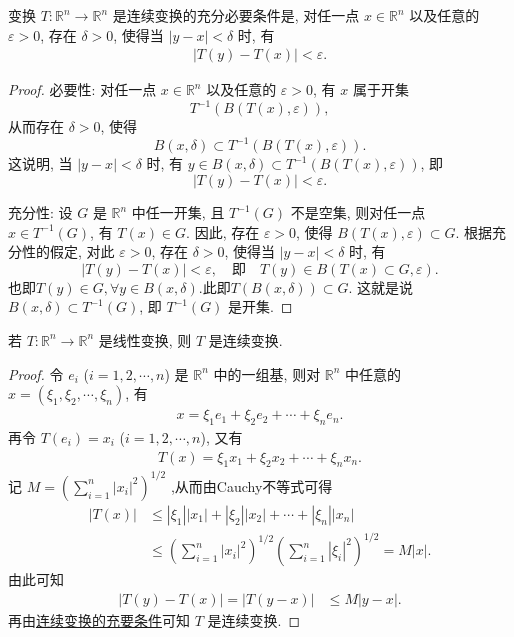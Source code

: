\documentclass[../../main.tex]{subfiles}
\begin{document}
\begin{theorem}[连续变换的充要条件]\label{theorem:连续变换的充要条件}
变换 $T:\mathbb{R}^n\to\mathbb{R}^n$ 是连续变换的充分必要条件是, 对任一点 $x\in\mathbb{R}^n$ 以及任意的 $\varepsilon>0$, 存在 $\delta>0$, 使得当 $|y - x|<\delta$ 时, 有
\begin{align}
|T(y) - T(x)|<\varepsilon.\label{eq:thm221}
\end{align}
\end{theorem}
\begin{proof}
{\heiti 必要性:} 对任一点 $x\in\mathbb{R}^n$ 以及任意的 $\varepsilon>0$, 有 $x$ 属于开集
\[
T^{-1}(B(T(x),\varepsilon)),
\]
从而存在 $\delta>0$, 使得
\[
B(x,\delta)\subset T^{-1}(B(T(x),\varepsilon)).
\]
这说明, 当 $|y - x|<\delta$ 时, 有 $y\in B(x,\delta)\subset T^{-1}(B(T(x),\varepsilon))$, 即
\[
|T(y) - T(x)|<\varepsilon.
\]

{\heiti 充分性:} 设 $G$ 是 $\mathbb{R}^n$ 中任一开集, 且 $T^{-1}(G)$ 不是空集, 则对任一点 $x\in T^{-1}(G)$, 有 $T(x)\in G$. 因此, 存在 $\varepsilon>0$, 使得 $B(T(x),\varepsilon)\subset G$. 根据充分性的假定, 对此 $\varepsilon>0$, 存在 $\delta>0$, 使得当 $|y - x|<\delta$ 时, 有
\[
|T(y) - T(x)|<\varepsilon,\quad \text{即}\quad T(y)\in B(T(x)\subset G,\varepsilon).
\]
也即$T(y)\in G,\forall y\in B(x,\delta)$.此即$T(B(x,\delta))\subset G$.
这就是说 $B(x,\delta)\subset T^{-1}(G)$, 即 $T^{-1}(G)$ 是开集. 
\end{proof}

\begin{proposition}
若 $T:\mathbb{R}^n\to\mathbb{R}^n$ 是线性变换, 则 $T$ 是连续变换.
\end{proposition}
\begin{proof}
令 $e_i$ ($i = 1,2,\cdots,n$) 是 $\mathbb{R}^n$ 中的一组基, 则对 $\mathbb{R}^n$ 中任意的 $x = (\xi_1,\xi_2,\cdots,\xi_n)$, 有
\begin{align*}
x = \xi_1e_1 + \xi_2e_2 + \cdots + \xi_ne_n.
\end{align*}
再令 $T(e_i) = x_i$ ($i = 1,2,\cdots,n$), 又有
\begin{align*}
T(x) = \xi_1x_1 + \xi_2x_2 + \cdots + \xi_nx_n.
\end{align*}
记 $M = \left(\sum_{i = 1}^{n}|x_i|^2\right)^{1/2}$ ,从而由Cauchy不等式可得
\begin{align*}
|T(x)|&\leqslant|\xi_1||x_1| + |\xi_2||x_2| + \cdots + |\xi_n||x_n|\\
&\leqslant\left(\sum_{i = 1}^{n}|x_i|^2\right)^{1/2}\left(\sum_{i = 1}^{n}|\xi_i|^2\right)^{1/2} = M|x|.
\end{align*}
由此可知
\begin{align*}
|T(y) - T(x)| = |T(y - x)|&\leqslant M|y - x|.
\end{align*}
再由\hyperref[theorem:连续变换的充要条件]{连续变换的充要条件}可知 $T$ 是连续变换. 
\end{proof}
\end{document}
